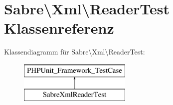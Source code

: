 \hypertarget{class_sabre_1_1_xml_1_1_reader_test}{}\section{Sabre\textbackslash{}Xml\textbackslash{}Reader\+Test Klassenreferenz}
\label{class_sabre_1_1_xml_1_1_reader_test}
Klassendiagramm für Sabre\textbackslash{}Xml\textbackslash{}Reader\+Test\+:\begin{figure}[H]
\begin{center}
\leavevmode
\includegraphics[height=2.000000cm]{class_sabre_1_1_xml_1_1_reader_test}
\end{center}
\end{figure}
